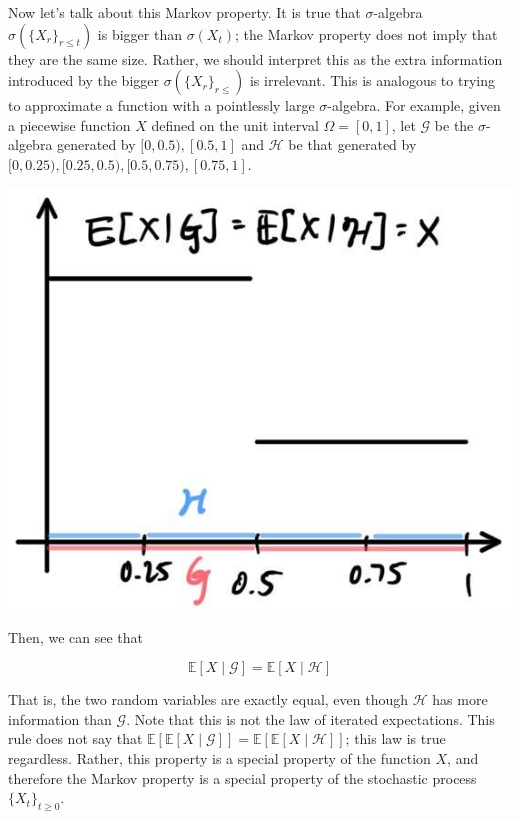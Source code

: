 \documentclass{article}
\theoremstyle{definition}
\theoremstyle{remark}
\theoremstyle{definition}
\begin{document}
    Now let's talk about this Markov property. It is true that $\sigma$-algebra $\sigma(\{X_r\}_{r \leq t})$ is bigger than $\sigma(X_t)$; the Markov property does not imply that they are the same size. Rather, we should interpret this as the extra information introduced by the bigger $\sigma(\{X_r\}_{r \leq})$ is irrelevant. This is analogous to trying to approximate a function with a pointlessly large $\sigma$-algebra. For example, given a piecewise function $X$ defined on the unit interval $\Omega = [0, 1]$, let $\mathcal{G}$ be the $\sigma$-algebra generated by $[0, 0.5), [0.5, 1]$ and $\mathcal{H}$ be that generated by $[0, 0.25), [0.25, 0.5), [0.5, 0.75), [0.75, 1]$. 

    \begin{center}
      \includegraphics[scale=0.3]{img/pointless_approximation.jpg}
    \end{center}

    Then, we can see that 

      \[\mathbb{E}[X \mid \mathcal{G}] = \mathbb{E}[X \mid \mathcal{H}]\]

    That is, the two random variables are exactly equal, even though $\mathcal{H}$ has more information than $\mathcal{G}$. Note that this is not the law of iterated expectations. This rule does not say that $\mathbb{E}[\mathbb{E}[X \mid \mathcal{G}]] = \mathbb{E}[ \mathbb{E}[X \mid \mathcal{H}]]$; this law is true regardless. Rather, this property is a special property of the function $X$, and therefore the Markov property is a special property of the stochastic process $\{X_t\}_{t \geq 0}$. 
\end{document}
